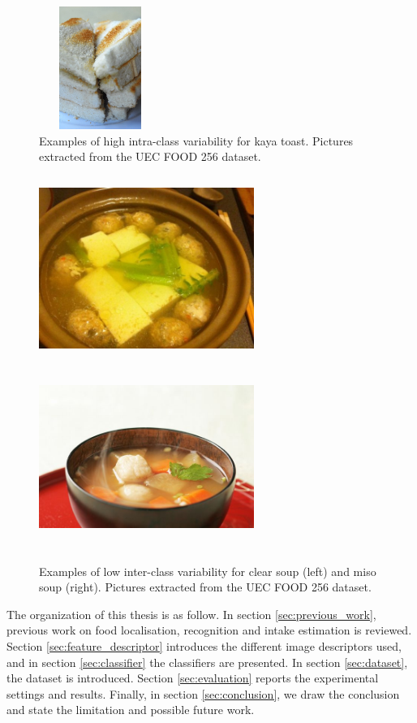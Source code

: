 \begin{figure}
    \includegraphics[height=4cm, width=4cm]{img/kaya_toast_6.jpg}
    \caption[Examples of high intra-class variability for kaya toast]{Examples of high intra-class variability for kaya toast. Pictures extracted from the UEC FOOD 256 dataset.}
    \label{fig:intra-class_variability}
\end{figure}

\begin{figure}
    \centering
    \includegraphics[width=7cm, height=6cm]{img/clear_soup.jpg}
    \includegraphics[width=7cm, height=6cm]{img/miso_soup.jpg}
    \caption[Examples of low inter-class variability for kaya toast]{Examples of low inter-class variability for clear soup (left) and miso soup (right). Pictures extracted from the UEC FOOD 256 dataset.}
    \label{fig:inter-class_variability}
\end{figure}

The organization of this thesis is as follow. In section \ref{sec:previous_work}, previous work on food localisation, recognition and intake estimation is reviewed. Section \ref{sec:feature_descriptor} introduces the different image descriptors used, and in section \ref{sec:classifier} the classifiers are presented. In section \ref{sec:dataset}, the dataset is introduced. Section \ref{sec:evaluation} reports the experimental settings and results. Finally, in section \ref{sec:conclusion}, we draw the conclusion and state the limitation and possible future work.
